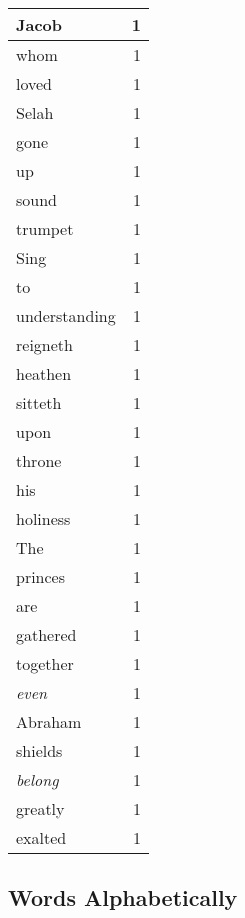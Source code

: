 \begin{center}
\begin{longtable}{l|r}
Jacob & 1 \\ \hline
whom & 1 \\ \hline
loved & 1 \\ \hline
Selah & 1 \\ \hline
gone & 1 \\ \hline
up & 1 \\ \hline
sound & 1 \\ \hline
trumpet & 1 \\ \hline
Sing & 1 \\ \hline
to & 1 \\ \hline
understanding & 1 \\ \hline
reigneth & 1 \\ \hline
heathen & 1 \\ \hline
sitteth & 1 \\ \hline
upon & 1 \\ \hline
throne & 1 \\ \hline
his & 1 \\ \hline
holiness & 1 \\ \hline
The & 1 \\ \hline
princes & 1 \\ \hline
are & 1 \\ \hline
gathered & 1 \\ \hline
together & 1 \\ \hline
\emph{even} & 1 \\ \hline
Abraham & 1 \\ \hline
shields & 1 \\ \hline
\emph{belong} & 1 \\ \hline
greatly & 1 \\ \hline
exalted & 1 \\ \hline
\end{longtable}
\end{center}



\normalsize



\subsection{Words Alphabetically}

